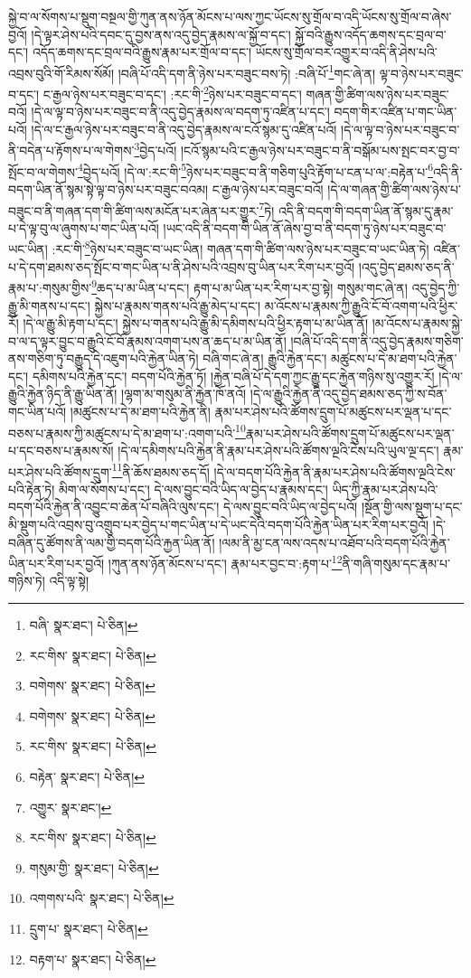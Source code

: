 སྐྱེ་བ་ལ་སོགས་པ་སྡུག་བསྔལ་གྱི་ཀུན་ནས་ཉོན་མོངས་པ་ལས་ཀྱང་ཡོངས་སུ་གྲོལ་བ་འདི་ཡོངས་སུ་གྲོལ་བ་ཞེས་བྱའོ། །དེ་ལྟར་ཤེས་པའི་དབང་དུ་བྱས་ནས་འདུ་བྱེད་རྣམས་ལ་སྐྱོ་བ་དང་། སྐྱོ་བའི་རྒྱུས་འདོད་ཆགས་དང་བྲལ་བ་དང་། འདོད་ཆགས་དང་བྲལ་བའི་རྒྱུས་རྣམ་པར་གྲོལ་བ་དང་། ཡོངས་སུ་གྲོལ་བར་འགྱུར་བ་འདི་ནི་ཤེས་པའི་འབྲས་བུའི་གོ་རིམས་སོམོ། །བཞི་པོ་འདི་དག་ནི་ཉེས་པར་བཟུང་བས་ཏེ། :བཞི་པོ་\footnote{བཞི་  སྣར་ཐང་།  པེ་ཅིན། }གང་ཞེ་ན། ལྟ་བ་ཉེས་པར་བཟུང་བ་དང་། ང་རྒྱལ་ཉེས་པར་བཟུང་བ་དང་། :རང་གི་\footnote{རང་གིས་  སྣར་ཐང་།  པེ་ཅིན། }ཉེས་པར་བཟུང་བ་དང་། གཞན་གྱི་ཚིག་ལས་ཉེས་པར་བཟུང་བའོ། །དེ་ལ་ལྟ་བ་ཉེས་པར་བཟུང་བ་ནི་འདུ་བྱེད་རྣམས་ལ་བདག་ཏུ་འཛིན་པ་དང་། བདག་གིར་འཛིན་པ་གང་ཡིན་པའོ། །དེ་ལ་ང་རྒྱལ་ཉེས་པར་བཟུང་བ་ནི་འདུ་བྱེད་རྣམས་ལ་ངའོ་སྙམ་དུ་འཛིན་པའོ། །དེ་ལ་ལྟ་བ་ཉེས་པར་བཟུང་བ་ནི་བདེན་པ་རྟོགས་པ་ལ་གེགས་\footnote{བགེགས་  སྣར་ཐང་།  པེ་ཅིན། }བྱེད་པའོ། །ངའོ་སྙམ་པའི་ང་རྒྱལ་ཉེས་པར་བཟུང་བ་ནི་བསྒོམ་པས་སྤང་བར་བྱ་བ་སྤོང་བ་ལ་གེགས་\footnote{བགེགས་  སྣར་ཐང་།  པེ་ཅིན། }བྱེད་པའོ། །དེ་ལ་:རང་གི་\footnote{རང་གིས་  སྣར་ཐང་།  པེ་ཅིན། }ཉེས་པར་བཟུང་བ་ནི་གཅིག་པུའི་རྟོག་པ་ངན་པ་ལ་:བརྟེན་པ་\footnote{བརྟེན་  སྣར་ཐང་།  པེ་ཅིན། }འདི་ནི་བདག་ཡིན་ནོ་སྙམ་སྟེ་ལྟ་བ་ཉེས་པར་བཟུང་བའམ། ང་རྒྱལ་ཉེས་པར་བཟུང་བའོ། །དེ་ལ་གཞན་གྱི་ཚིག་ལས་ཉེས་པ་བཟུང་བ་ནི་གཞན་དག་གི་ཚིག་ལས་མངོན་པར་ཞེན་པར་གྱུར་\footnote{འགྱུར་  སྣར་ཐང་། }ཏེ། འདི་ནི་བདག་གི་བདག་ཡིན་ནོ་སྙམ་དུ་རྣམ་པ་དེ་ལྟ་བུ་ལ་ཞུགས་པ་གང་ཡིན་པའོ། །ཡང་འདི་ནི་བདག་གི་ཡིན་ནོ་ཞེས་བྱ་བ་ནི་བདག་ཏུ་ཉེས་པར་བཟུང་བ་ཡང་ཡིན། :རང་གི་\footnote{རང་གིས་  སྣར་ཐང་།  པེ་ཅིན། }ཉེས་པར་བཟུང་བ་ཡང་ཡིན། གཞན་དག་གི་ཚིག་ལས་ཉེས་པར་བཟུང་བ་ཡང་ཡིན་ཏེ། འཛིན་པ་དེ་དག་ཐམས་ཅད་སྤོང་བ་གང་ཡིན་པ་ནི་ཤེས་པའི་འབྲས་བུ་ཡིན་པར་རིག་པར་བྱའོ། །འདུ་བྱེད་ཐམས་ཅད་ནི་རྣམ་པ་:གསུམ་གྱིས་\footnote{གསུམ་གྱི་  སྣར་ཐང་།  པེ་ཅིན། }ཆད་པ་མ་ཡིན་པ་དང་། རྟག་པ་མ་ཡིན་པར་རིག་པར་བྱ་སྟེ། གསུམ་གང་ཞེ་ན། འདུ་བྱེད་ཀྱི་རྒྱུ་མི་གནས་པ་དང་། སྐྱེས་པ་རྣམས་གནས་པའི་རྒྱུ་མེད་པ་དང་། མ་འོངས་པ་རྣམས་ཀྱི་རྒྱུའི་ངོ་བོ་འགག་པའི་ཕྱིར་རོ། །དེ་ལ་རྒྱུ་མི་རྟག་པ་དང་། སྐྱེས་པ་གནས་པའི་རྒྱུ་མི་དམིགས་པའི་ཕྱིར་རྟག་པ་མ་ཡིན་ནོ། །མ་འོངས་པ་རྣམས་སྐྱེ་བ་ལ་ད་ལྟར་བྱུང་བ་རྒྱུའི་ངོ་བོ་རྣམས་འགག་པས་ན་ཆད་པ་མ་ཡིན་ནོ། །བཞི་པོ་འདི་དག་ནི་འདུ་བྱེད་རྣམས་གཅིག་ནས་གཅིག་ཏུ་བརྒྱུད་དེ་འཇུག་པའི་རྐྱེན་ཡིན་ཏེ། བཞི་གང་ཞེ་ན། རྒྱུའི་རྐྱེན་དང་། མཚུངས་པ་དེ་མ་ཐག་པའི་རྐྱེན་དང་། དམིགས་པའི་རྐྱེན་དང་། བདག་པོའི་རྐྱེན་ཏོ། །རྐྱེན་བཞི་པོ་དེ་དག་ཀྱང་རྒྱུ་དང་རྐྱེན་གཉིས་སུ་འགྱུར་རོ། །དེ་ལ་རྒྱུའི་རྐྱེན་ཉིད་ནི་རྒྱུ་ཡིན་ནོ། །ལྷག་མ་གསུམ་ནི་རྐྱེན་ཁོ་ནའོ། །དེ་ལ་རྒྱུའི་རྐྱེན་ནི་འདུ་བྱེད་ཐམས་ཅད་ཀྱི་ས་བོན་གང་ཡིན་པའོ། །མཚུངས་པ་དེ་མ་ཐག་པའི་རྐྱེན་ནི། རྣམ་པར་ཤེས་པའི་ཚོགས་དྲུག་པོ་མཚུངས་པར་ལྡན་པ་དང་བཅས་པ་རྣམས་ཀྱི་མཚུངས་པ་དེ་མ་ཐག་པ་:འགག་པའི་\footnote{འགགས་པའི་  སྣར་ཐང་།  པེ་ཅིན། }རྣམ་པར་ཤེས་པའི་ཚོགས་དྲུག་པོ་མཚུངས་པར་ལྡན་པ་དང་བཅས་པ་རྣམས་སོ། །དེ་ལ་དམིགས་པའི་རྐྱེན་ནི་རྣམ་པར་ཤེས་པའི་ཚོགས་ལྔའི་ངེས་པའི་ཡུལ་ལྔ་དང་། རྣམ་པར་ཤེས་པའི་ཚོགས་དྲུག་\footnote{དྲུག་པ་  སྣར་ཐང་།  པེ་ཅིན། }ནི་ཆོས་ཐམས་ཅད་དོ། །དེ་ལ་བདག་པོའི་རྐྱེན་ནི་རྣམ་པར་ཤེས་པའི་ཚོགས་ལྔའི་ངེས་པའི་རྟེན་ཏེ། མིག་ལ་སོགས་པ་དང་། དེ་ལས་བྱུང་བའི་ཡིད་ལ་བྱེད་པ་རྣམས་དང་། ཡིད་ཀྱི་རྣམ་པར་ཤེས་པའི་བདག་པོའི་རྐྱེན་ནི་འབྱུང་བ་ཆེན་པོ་བཞིའི་ལུས་དང་། དེ་ལས་བྱུང་བའི་ཡིད་ལ་བྱེད་པའོ། །སྔོན་གྱི་ལས་སྡུག་པ་དང་མི་སྡུག་པའི་འབྲས་བུ་འགྲུབ་པར་བྱེད་པ་གང་ཡིན་པ་དེ་ཡང་དེའི་བདག་པོའི་རྐྱེན་ཡིན་པར་རིག་པར་བྱའོ། །དེ་བཞིན་དུ་ཚོགས་ནི་ལམ་གྱི་བདག་པོའི་རྐྱན་ཡིན་ནོ། །ལམ་ནི་མྱ་ངན་ལས་འདས་པ་འཐོབ་པའི་བདག་པོའི་རྐྱེན་ཡིན་པར་རིག་པར་བྱའོ། །ཀུན་ནས་ཉོན་མོངས་པ་དང་། རྣམ་པར་བྱང་བ་:རྟག་པ་\footnote{བརྟག་པ་  སྣར་ཐང་།  པེ་ཅིན། }ནི་གཞི་གསུམ་དང་རྣམ་པ་གཉིས་ཏེ། འདི་ལྟ་སྟེ། 